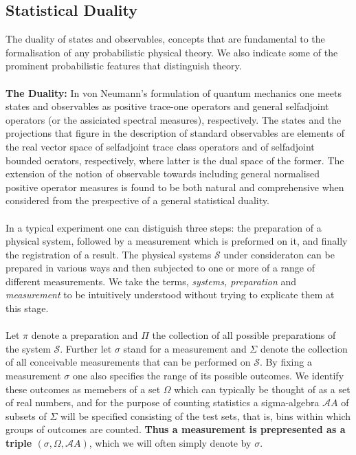 \documentclass[10pt]{article}
\newcounter{theo}
\newcommand{\sys}{\mathcal{S}}
\newcommand{\m}{\mathcal{A}}
\begin{document}
    \subsection{Statistical Duality}
    \indent The duality of states and observables, concepts that are fundamental to the formalisation of any probabilistic physical theory. We also indicate some of the prominent probabilistic features that distinguish theory.
    \\
    \\
    \textbf{The Duality:}  In von Neumann's formulation of quantum mechanics one meets states and observables as positive trace-one operators and general selfadjoint operators (or the assiciated spectral measures), respectively. The states and the projections that figure in the description of standard observables are elements of the real vector space of selfadjoint trace class operators and of selfadjoint bounded oerators, respectively, where latter is the dual space of the former. The extension of the notion of observable towards including general normalised positive operator measures is found to be both natural and comprehensive when considered from the prespective of a general statistical duality.
    \\
    \\
    In a typical experiment one can distiguish three steps: the preparation of a physical system, followed by a measurement which is preformed on it, and finally the registration of a result. The physical systems $\sys$ under consideraton can be prepared in various ways and then subjected to one or more of a range of different measurements. We take the terms, \textit{systems, preparation} and \textit{measurement} to be intuitively understood without trying to explicate them at this stage.
    \\
    \\
    Let $\pi$ denote a preparation and $\Pi$ the collection of all possible preparations of the system $\sys$. Further let $\sigma$ stand for a measurement and $\Sigma$ denote the collection of all conceivable measurements that can be performed on $\sys$. By fixing a measurement $\sigma$ one also specifies the range of its possible outcomes. We identify these outcomes as memebers of a set $\Omega$ which can typically be thought of as a set of real numbers, and for the purpose of counting statistics a sigma-algebra $\m{A}$ of subsets of $\Sigma$  will be specified consisting of the test sets, that is, bins within which groups of outcomes are counted. \textbf{Thus a measurement is prepresented as a triple $(\sigma, \Omega, \m{A})$}, which we will often simply denote by $\sigma$.
\end{document}
